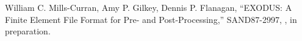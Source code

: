 William C. Mills-Curran, Amy P. Gilkey, Dennis P. Flanagan,
``EXODUS: A Finite Element File Format for Pre- and Post-Processing,''
SAND87-2997, \SNLA, in preparation.
